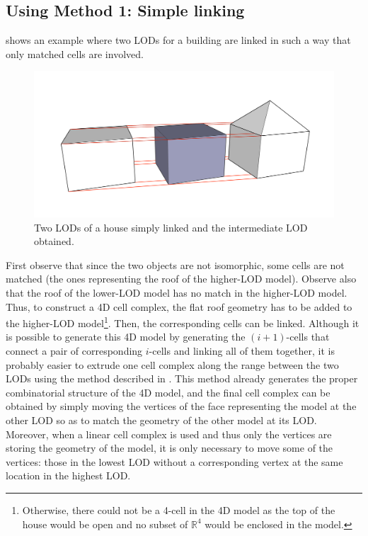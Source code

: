 \subsection{Using Method 1: Simple linking}

 shows an example where two LODs for a building are linked in such a way that only matched cells are involved.
\begin{figure}[tb]
   \centering
   \includegraphics[width=\linewidth]{figs/exsimple}
   \caption[Simple linking]{Two LODs of a house simply linked and the intermediate LOD obtained.}
\label{fig:exsimple}
\end{figure}
First observe that since the two objects are not isomorphic, some cells are not matched (the ones representing the roof of the higher-LOD model).
Observe also that the roof of the lower-LOD model has no match in the higher-LOD model.
Thus, to construct a 4D cell complex, the flat roof geometry has to be added to the higher-LOD model\footnote{Otherwise, there could not be a 4-cell in the 4D model as the top of the house would be open and no subset of $\mathbb{R}^4$ would be enclosed in the model.}.
Then, the corresponding cells can be linked.
Although it is possible to generate this 4D model by generating the $(i+1)$-cells that connect a pair of corresponding $i$-cells and linking all of them together, it is probably easier to extrude one cell complex along the range between the two LODs using the method described in .
This method already generates the proper combinatorial structure of the 4D model, and the final cell complex can be obtained by simply moving the vertices of the face representing the model at the other LOD so as to match the geometry of the other model at its LOD.\@
Moreover, when a linear cell complex is used and thus only the vertices are storing the geometry of the model, it is only necessary to move some of the vertices: those in the lowest LOD without a corresponding vertex at the same location in the highest LOD.\@


